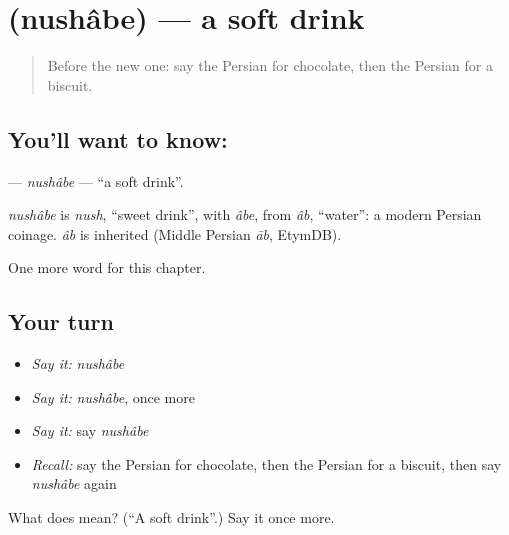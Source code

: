 \section[\texorpdfstring{\fa{نوشابه} (nushâbe)}{نوشابه (nushâbe)}]{ (nushâbe) — a soft drink}

\label{lesson:FA-C167-nushabe}



\begin{quote}
Before the new one: say the Persian for chocolate, then the Persian for a biscuit.
\end{quote}

\subsection*{You'll want to know: }
\textbf{} — \emph{nushâbe} — \textquotedblleft{}a soft drink\textquotedblright{}.

\begin{cousinweb}
\emph{nushâbe} is \emph{nush}, \textquotedblleft{}sweet drink\textquotedblright{}, with \emph{âbe}, from \emph{âb}, \textquotedblleft{}water\textquotedblright{}: a modern Persian coinage. \emph{âb} is inherited (Middle Persian \emph{āb}, EtymDB).
\end{cousinweb}

\begin{grammarlens}[title={What you've built}]
One more word for this chapter.
\end{grammarlens}

\subsection*{Your turn}
\begin{itemize}
\raggedright
  \item \emph{Say it:} \emph{nushâbe}
  \item \emph{Say it:} \emph{nushâbe}, once more
  \item \emph{Say it:} say \emph{nushâbe}
  \item \emph{Recall:} say the Persian for chocolate, then the Persian for a biscuit, then say \emph{nushâbe} again
\end{itemize}

\begin{tcolorbox}[breakable,colback=teal!4,colframe=teal!35!black,title={Before you move on}]
What does  mean? (\textquotedblleft{}A soft drink\textquotedblright{}.) Say it once more.
\end{tcolorbox}
